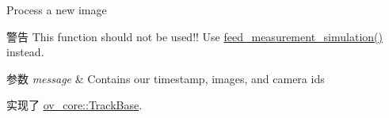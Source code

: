 Process a new image 

\begin{DoxyWarning}{警告}
This function should not be used!! Use \hyperlink{classov__core_1_1TrackSIM_a00388c410c804854c4c91e1a392d44e0}{feed\+\_\+measurement\+\_\+simulation()} instead. 
\end{DoxyWarning}

\begin{DoxyParams}{参数}
{\em message} & Contains our timestamp, images, and camera ids \\
\hline
\end{DoxyParams}


实现了 \hyperlink{classov__core_1_1TrackBase_a18f208f4047e9a1955406806ba68a8c1}{ov\+\_\+core\+::\+Track\+Base}.

